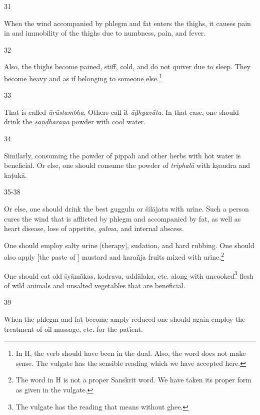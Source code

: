\begin{translation}
    \item[31]
    \begin{sloka}
    When the wind accompanied by phlegm and fat enters the thighs, it causes pain in and immobility of the thighs due to numbness, pain, and fever. 
    \end{sloka}

    \item[32] 
    \begin{sloka}
    Also, the thighs become pained, stiff, cold, and do not quiver due to sleep. They become heavy and as if belonging to someone else.\footnote{In H, the verb  should have been in the dual. Also, the word  does not make sense. The vulgate has the sensible reading  which we have accepted here.}
    \end{sloka}

    \item[33]
    \begin{sloka}
    That is called \textit{ūrūstambha}. Others call it \textit{āḍhyavāta}. In that case, one should drink the \textit{ṣaṇḍharaṇa} powder with cool water. 
    \end{sloka}

    \item[34]
    \begin{sloka}
    Similarly, consuming the powder of \gls{pippalī} and other herbs with hot water is beneficial. Or else, one should consume the powder of \textit{triphalā} with \gls{kṣaudra} and \gls{kaṭukā}. 
    \end{sloka}

    \item[35-38]
    \begin{sloka}
    Or else, one should drink the best \gls{guggulu} or \gls{śilājatu} with urine. Such a person cures the wind that is afflicted by phlegm and accompanied by fat, as well as heart disease, loss of appetite, \textit{gulma}, and internal abscess. 

    One should employ salty urine [therapy], sudation, and hard rubbing. One should also apply [the paste of ] mustard and \gls{karañja} fruits mixed with urine.\footnote{The word  in H is not a proper Sanskrit word. We have taken its proper form  as given in the vulgate.}

    One should eat old \gls{śyāmāka}s, \gls{kodrava}, \gls{uddālaka}, etc. along with uncooked\footnote{The vulgate has the reading  that means without ghee.} flesh of wild animals and unsalted vegetables that are beneficial.
    \end{sloka}

    \item[39]
    \begin{sloka}
    When the phlegm and fat become amply reduced one should again employ the treatment of oil massage, etc. for the patient.  
    \end{sloka}
    
\end{translation}
